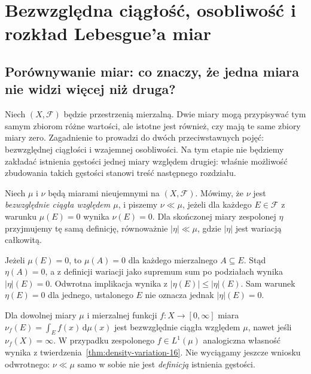 \chapter[Bezwzględna ciągłość i rozkład Lebesgue'a]{Bezwzględna ciągłość, osobliwość i rozkład Lebesgue'a miar}
\label{ch:ac-singular-17}

\section{Porównywanie miar: co znaczy, że jedna miara nie widzi więcej niż druga?}
Niech $(X,\mathcal F)$ będzie przestrzenią mierzalną. Dwie miary mogą
przypisywać tym samym zbiorom różne wartości, ale istotne jest również,
czy mają te same zbiory miary zero. Zagadnienie to prowadzi do dwóch
przeciwstawnych pojęć: bezwzględnej ciągłości i wzajemnej osobliwości.
Na tym etapie nie będziemy zakładać istnienia gęstości jednej miary
względem drugiej: właśnie możliwość zbudowania takich gęstości
stanowi treść następnego rozdziału.

\begin{definicja}
\label{def:ac-measure-17}
Niech $\mu$ i $\nu$ będą miarami nieujemnymi na $(X,\mathcal F)$.
Mówimy, że $\nu$ jest \emph{bezwzględnie ciągła względem $\mu$},
i piszemy $\nu\ll\mu$, jeżeli dla każdego $E\in\mathcal F$
z warunku $\mu(E)=0$ wynika $\nu(E)=0$.
Dla skończonej miary zespolonej $\eta$ przyjmujemy tę samą definicję,
równoważnie $|\eta|\ll\mu$, gdzie $|\eta|$ jest wariacją całkowitą.
\end{definicja}

\begin{uwaga}
Jeżeli $\mu(E)=0$, to $\mu(A)=0$ dla każdego mierzalnego $A\subseteq E$.
Stąd $\eta(A)=0$, a z definicji wariacji jako supremum sum po podziałach
wynika $|\eta|(E)=0$. Odwrotna implikacja wynika z
$|\eta(E)|\le|\eta|(E)$. Sam warunek $\eta(E)=0$ dla jednego,
ustalonego $E$ nie oznacza jednak $|\eta|(E)=0$.
\end{uwaga}

\begin{przyklad}
\label{ex:ac-density-17}
Dla dowolnej miary $\mu$ i mierzalnej funkcji $f:X\to[0,\infty]$
miara $\nu_f(E)=\int_E f(x)\,\mathrm d\mu(x)$ jest bezwzględnie
ciągła względem $\mu$, nawet jeśli $\nu_f(X)=\infty$.
W przypadku zespolonego $f\in L^1(\mu)$ analogiczna własność
wynika z twierdzenia~\ref{thm:density-variation-16}.
Nie wyciągamy jeszcze wniosku odwrotnego: $\nu\ll\mu$
samo w sobie nie jest \emph{definicją} istnienia gęstości.
\end{przyklad}

